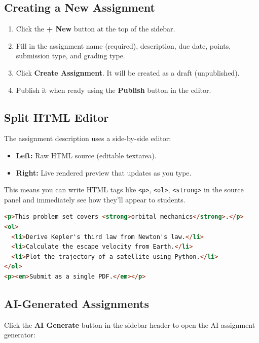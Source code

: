 \documentclass[12pt,letterpaper]{article}
\begin{document}
\subsection{Creating a New Assignment}

\begin{enumerate}[leftmargin=*]
    \item Click the \textbf{+ New} button at the top of the sidebar.
    \item Fill in the assignment name (required), description, due date, points, submission type, and grading type.
    \item Click \textbf{Create Assignment}. It will be created as a draft (unpublished).
    \item Publish it when ready using the \textbf{Publish} button in the editor.
\end{enumerate}

\subsection{Split HTML Editor}

The assignment description uses a side-by-side editor:
\begin{itemize}[leftmargin=*]
    \item \textbf{Left:} Raw HTML source (editable textarea).
    \item \textbf{Right:} Live rendered preview that updates as you type.
\end{itemize}

This means you can write HTML tags like \texttt{<p>}, \texttt{<ol>}, \texttt{<strong>} in the source panel and immediately see how they'll appear to students.

\begin{lstlisting}[language=HTML,title={Example: Assignment Description HTML}]
<p>This problem set covers <strong>orbital mechanics</strong>.</p>
<ol>
  <li>Derive Kepler's third law from Newton's law.</li>
  <li>Calculate the escape velocity from Earth.</li>
  <li>Plot the trajectory of a satellite using Python.</li>
</ol>
<p><em>Submit as a single PDF.</em></p>
\end{lstlisting}

\subsection{AI-Generated Assignments}

Click the \textbf{AI Generate} button in the sidebar header to open the AI assignment generator:
\end{document}
